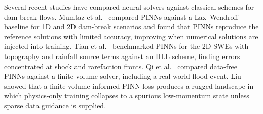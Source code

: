 \documentclass[12pt]{article}
\newenvironment{newtext}{\par\color{red}}{\par}
\begin{document}
\begin{newtext}
Several recent studies have compared neural solvers against classical schemes for dam-break flows. Mumtaz et al.~\cite{mumtaz2025dambreak} compared PINNs against a Lax--Wendroff baseline for 1D and 2D dam-break scenarios and found that PINNs reproduce the reference solutions with limited accuracy, improving when numerical solutions are injected into training. Tian et al.~\cite{tian2025pinnswe} benchmarked PINNs for the 2D SWEs with topography and rainfall source terms against an HLL scheme, finding errors concentrated at shock and rarefaction fronts. Qi et al.~\cite{qi2024pinnswe} compared data-free PINNs against a finite-volume solver, including a real-world flood event. Liu \cite{liu2026fvmpinn} showed that a finite-volume-informed PINN loss produces a rugged landscape in which physics-only training collapses to a spurious low-momentum state unless sparse data guidance is supplied.
\end{newtext}

\end{document}
